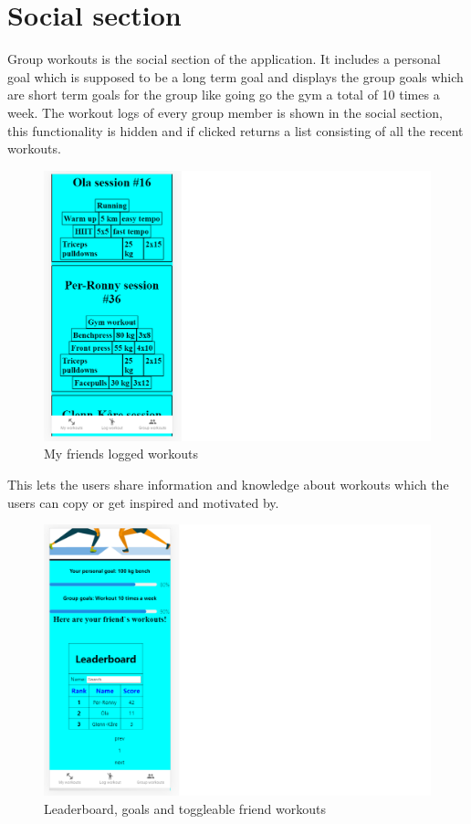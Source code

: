 \section{Social section}
Group workouts is the social section of the application. It includes a personal goal which is supposed to be a long term goal and displays the group goals which are short term goals for the group like going go the gym a total of 10 times a week.
The workout logs of every group member is shown in the social section, this functionality is hidden and if clicked returns a list consisting of all the recent workouts.
\begin{figure}[H]
    \centering
    \includegraphics[scale=0.6]{figures/friendsworkoutlogs.png}
    \caption{My friends logged workouts}
    \label{FriendLog}
\end{figure}
This lets the users share information and knowledge about workouts which the users can copy or get inspired and motivated by.
\begin{figure}[H]
    \centering
    \includegraphics[scale=0.6]{figures/leaderboardandgoals.png}
    \caption{Leaderboard, goals and toggleable friend workouts}
    \label{LeaderB}
\end{figure}
